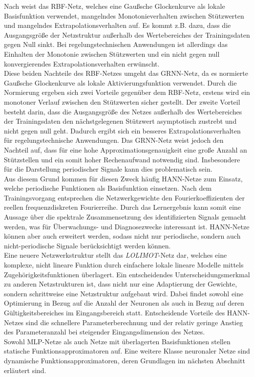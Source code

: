 Nach \cite{Schroder.2010} weist das RBF-Netz, welches eine Gaußsche Glockenkurve als lokale Basisfunktion verwendet, mangelndes Monotonieverhalten zwischen Stützwerten und mangelndes Extrapolationsverhalten auf. Es kommt z.B. dazu, dass die Ausgangsgröße der Netzstruktur außerhalb des Wertebereiches der Trainingsdaten gegen Null sinkt. Bei regelungstechnischen Anwendungen ist allerdings das Einhalten der Monotonie zwischen Stützwerten und ein nicht gegen null konvergierendes Extrapolationsverhalten erwünscht. \cite{Schroder.2010} \\ 
Diese beiden Nachteile des RBF-Netzes umgeht das GRNN-Netz, da es normierte Gaußsche Glockenkurve als lokale Aktivierungsfunktion verwendet. Durch die Normierung ergeben sich zwei Vorteile gegenüber dem RBF-Netz, erstens wird ein monotoner Verlauf zwischen den Stützwerten sicher gestellt. Der zweite Vorteil besteht darin, dass die Ausgangsgröße des Netzes außerhalb des Wertebereiches der Trainingsdaten den nächstgelegenen Stützwert asymptotisch zustrebt und nicht gegen null geht. Dadurch ergibt sich ein besseres Extrapolationsverhalten für regelungstechnische Anwendungen. Das GRNN-Netz weist jedoch den Nachteil auf, dass für eine hohe Approximationsgenauigkeit eine große Anzahl an Stützstellen und ein somit hoher Rechenaufwand notwendig sind. Insbesondere für die Darstellung periodischer Signale kann dies problematisch sein. \cite{Schroder.2010} \\
Aus diesem Grund kommen für diesen Zweck häufig HANN-Netze zum Einsatz, welche periodische Funktionen als Basisfunktion einsetzen. Nach dem Trainingsvorgang entsprechen die Netzwerkgewichte den Fourierkoeffizienten der reellen frequenzdiskreten Fourierreihe. Durch das Lernergebnis kann somit eine Aussage über die spektrale Zusammensetzung des identifizierten Signals gemacht werden, was für Überwachungs- und Diagnosezwecke interessant ist. HANN-Netze können aber auch erweitert werden, sodass nicht nur periodische, sondern auch nicht-periodische Signale berücksichtigt werden können. \cite{Schroder.2010} \\  
Eine neuere Netzwerkstruktur stellt das \textit{LOLIMOT}-Netz dar, welches eine komplexe, nicht lineare Funktion durch einfachere lokale lineare Modelle mittels Zugehörigkeitsfunktionen überlagert. Ein entscheidendes Unterscheidungsmerkmal zu anderen Netzstrukturen ist, dass nicht nur eine Adaptierung der Gewichte, sondern schrittweise eine Netzstruktur aufgebaut wird. Dabei findet sowohl eine Optimierung in Bezug auf die Anzahl der Neuronen als auch in Bezug auf deren Gültigkeitsbereiches im Eingangsbereich statt. Entscheidende Vorteile des HANN-Netzes sind die schnellere Parameterberechnung und der relativ geringe Anstieg des Parameteranzahl bei steigender Eingangsdimension des Netzes. \cite{Schroder.2010} \\
Sowohl MLP-Netze als auch Netze mit überlagerten Basisfunktionen stellen statische Funktionsapproximatoren auf. Eine weitere Klasse neuronaler Netze sind dynamische Funktionsapproximatoren, deren Grundlagen im nächsten Abschnitt erläutert sind.

